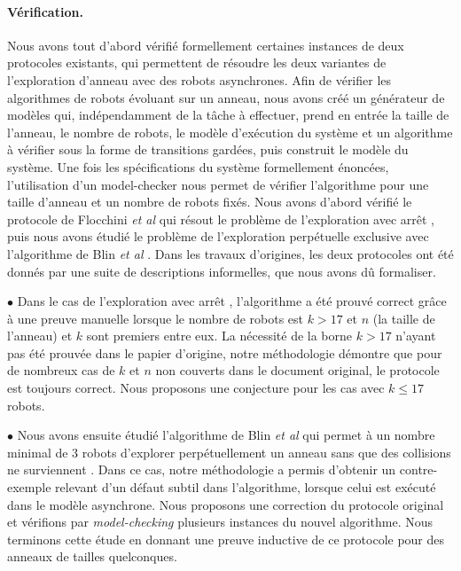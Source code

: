 \paragraph{Vérification.} Nous avons tout d'abord vérifié formellement
certaines instances de deux protocoles existants, qui permettent de
résoudre les deux variantes de l'exploration d'anneau avec des robots
asynchrones.  Afin de vérifier les algorithmes de robots évoluant sur
un anneau, nous avons créé un générateur de modèles qui,
indépendamment de la tâche à effectuer, prend en entrée la taille de
l'anneau, le nombre de robots, le modèle d'exécution du système et un
algorithme à vérifier sous la forme de transitions gardées, puis
construit le modèle du système. Une fois les spécifications du système
formellement énoncées, l'utilisation d'un model-checker nous permet de
vérifier l'algorithme pour une taille d'anneau et un nombre de robots
fixés.  Nous avons d'abord vérifié le protocole de Flocchini \emph{et
  al} qui résout le problème de l'exploration avec arrêt \cite{
  flocchini_computing_2007}, puis nous avons étudié le problème de
l'exploration perpétuelle exclusive avec l'algorithme de Blin \emph{et
  al} \cite{blin_exclusive_2010}. Dans les travaux d'origines, les
deux protocoles ont été donnés par une suite de descriptions
informelles, que nous avons dû formaliser.

$\bullet$ Dans le cas de l'exploration avec arrêt
\cite{flocchini_computing_2007}, l'algorithme a été prouvé correct
grâce à une preuve manuelle lorsque le nombre de robots est $k > 17 $
et $ n $ (la taille de l'anneau) et $ k $ sont premiers entre eux.  La
nécessité de la borne $k > 17 $ n'ayant pas été prouvée dans le papier
d'origine, notre méthodologie démontre que pour de nombreux cas de $k
$ et $ n $ non couverts dans le document original, le protocole est
toujours correct. Nous proposons une conjecture pour les cas avec $ k
\leq 17 $ robots.
 
$\bullet$ Nous avons ensuite étudié l'algorithme de Blin \emph{et al } qui
permet à un nombre minimal de $3$ robots d'explorer perpétuellement un
anneau sans que des collisions ne surviennent
\cite{blin_exclusive_2010}.  Dans ce cas, notre méthodologie a permis
d'obtenir un contre-exemple relevant d'un défaut subtil dans
l'algorithme, lorsque celui est exécuté dans le modèle asynchrone.
Nous proposons une correction du protocole original et vérifions par
\emph{model-checking} plusieurs instances du nouvel algorithme. Nous
terminons cette étude en donnant une preuve inductive de ce protocole
pour des anneaux de tailles quelconques.

